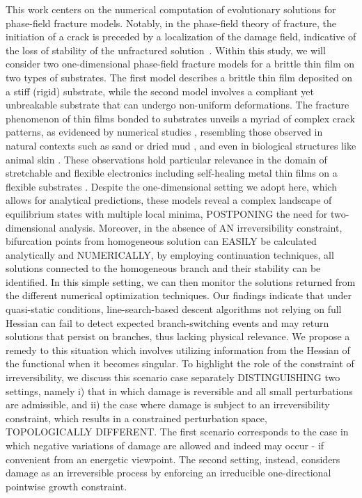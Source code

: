 This work centers on the numerical computation of evolutionary solutions for phase-field fracture models. Notably, in the phase-field theory of fracture, the initiation of a crack is preceded by a localization of the damage field, indicative of the loss of stability of the unfractured solution~\cite{Baldelli2014-ho,Kuhn2015-rt,Baldelli2021-gc,Harandi2023-cd}. Within this study, we will consider two one-dimensional phase-field fracture models for a brittle thin film on two types of substrates. The first model describes a brittle thin film deposited on a stiff (rigid) substrate, while the second model involves a compliant yet unbreakable substrate that can undergo non-uniform deformations. The fracture phenomenon of thin films bonded to substrates unveils a myriad of complex crack patterns, as evidenced by numerical studies \cite{Baldelli2014-ho,Alessi2019-bx,Hu2020-nt,Salman2021-mn,Baldelli2021-gc}, resembling those observed in natural contexts such as sand or dried mud \cite{Goehring2010-xz}, and even in biological structures like animal skin \cite{Qin2014-wz}. These observations hold particular relevance in the domain of stretchable and flexible electronics \cite{Faurie2019-to,Godard2022-ss} including  self-healing metal thin films on a flexible substrates \cite{Trost2024-ca}.  Despite the one-dimensional setting we adopt here, which allows for analytical predictions, these models reveal a complex landscape of equilibrium states with multiple local minima, POSTPONING the need for two-dimensional analysis. Moreover, in the absence of AN irreversibility constraint, bifurcation points from homogeneous solution can EASILY be calculated analytically and NUMERICALLY, by employing continuation techniques, all solutions connected to the homogeneous branch and their stability can be identified. 
In this simple setting, we can then monitor the solutions returned from  the different  numerical optimization techniques. Our findings indicate that under quasi-static conditions, line-search-based descent algorithms not relying on full Hessian can fail to detect expected branch-switching events and may return solutions that persist on  branches, thus lacking physical relevance. 
We propose a remedy to this situation which involves utilizing information from the Hessian of the functional when it becomes singular. 
To highlight the role of the constraint of irreversibility, we discuss this scenario case separately DISTINGUISHING two settings, namely i) that in which damage is reversible and all small perturbations are admissible, and ii) the case where damage is subject to an irreversibility constraint, which results in a constrained perturbation space, TOPOLOGICALLY DIFFERENT. The first scenario corresponds to the case in which negative variations of damage are allowed and indeed may occur - if convenient from an energetic viewpoint. The second setting, instead, considers damage as an irreversible process by enforcing an irreducible one-directional pointwise growth constraint.

